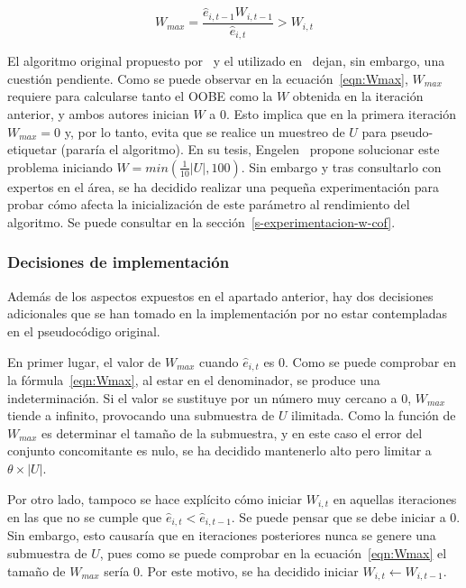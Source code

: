 \begin{equation}\label{eqn:Wmax} W_{max} = \frac{\hat{e}_{i,t-1}W_{i,t-1}}{\hat{e}_{i, t}} > W_{i,t} \end{equation}


\label{parag:Wmax_inicial} El algoritmo original propuesto por~\cite{originalCoForest2007} y el utilizado en~\cite{zhou2021SemisupervisedRecommendationAttack} dejan, sin embargo, una cuestión pendiente. Como se puede observar en la ecuación~\ref{eqn:Wmax}, $W_{max}$ requiere para calcularse tanto el OOBE como la $W$ obtenida en la iteración anterior, y ambos autores inician $W$ a 0. Esto implica que en la primera iteración $W_{max} = 0$ y, por lo tanto, evita que se realice un muestreo de $U$ para pseudo-etiquetar (pararía el algoritmo). En su tesis, Engelen~\cite{engelen2018thesis} propone solucionar este problema iniciando $W = min(\frac{1}{10}|U|, 100)$. Sin embargo y tras consultarlo con expertos en el área, se ha decidido realizar una pequeña experimentación para probar cómo afecta la inicialización de este parámetro al rendimiento del algoritmo. Se puede consultar en la sección~\ref{s-experimentacion-w-cof}.


\subsubsection{Decisiones de implementación}

Además de los aspectos expuestos en el apartado anterior, hay dos decisiones adicionales que se han tomado en la implementación por no estar contempladas en el pseudocódigo original.

En primer lugar, el valor de $W_{max}$ cuando $\hat{e}_{i, t}$  es $0$. Como se puede comprobar en la fórmula~\ref{eqn:Wmax}, al estar en el denominador, se produce una indeterminación. Si el valor se sustituye por un número muy cercano a 0, $W_{max}$ tiende a infinito, provocando una submuestra de $U$ ilimitada. Como la función de $W_{max}$ es determinar el tamaño de la submuestra, y en este caso el error del conjunto concomitante es nulo, se ha decidido mantenerlo alto pero limitar a $\theta\times|U|$.

Por otro lado, tampoco se hace explícito cómo iniciar $W_{i,t}$ en aquellas iteraciones en las que no se cumple que $\hat{e}_{i,t} < \hat{e}_{i,t-1}$. Se puede pensar que se debe iniciar a 0. Sin embargo, esto causaría que en iteraciones posteriores nunca se genere una submuestra de $U$, pues como se puede comprobar en la ecuación~\ref{eqn:Wmax} el tamaño de $W_{max}$ sería $0$. Por este motivo, se ha decidido iniciar $W_{i,t} \leftarrow W_{i,t-1}$.


